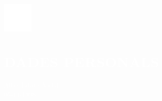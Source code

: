 \documentclass[../main.tex]{subfiles}
\begin{document}
    \hspace*{0.2cm}
    \begin{minipage}[t]{2cm}
        \vspace*{-0.3cm}\includegraphics[width=1.5cm]{../assets/person.png}
    \end{minipage}
    \begin{minipage}[t]{5cm}
    
        \section*{\textcolor{white}{DADES PERSONALS}}
        \vspace*{-0.25cm}
        \textcolor{white}{
            Alba Talaya Vidal \\
            05-11-1998
        }
    \end{minipage}
\end{document}
